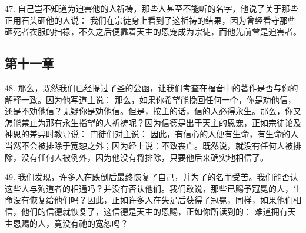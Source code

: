 47. 自己岂不知道为迫害他的人祈祷，那些人甚至不能听的名字，他说了关于那些正用石头砸他的人说： 我们在宗徒身上看到了这祈祷的结果，因为曾经看守那些砸死者衣服的扫禄，不久之后便靠着天主的恩宠成为宗徒，而他先前曾是迫害者。\par


\subsection{第十一章}

\par

48. 那么，既然我们已经提过了圣的公函，让我们考查在福音中的著作是否与你的解释一致。因为他写道主说： 那么，如果你希望能挽回任何一个，你是劝他信，还是不劝他信？无疑你是劝他信。但是，按主的话，信的人必得永生。那么，你又怎能禁止为那有永生指望的人祈祷呢？因为信德是出于天主的恩宠，正如宗徒论及神恩的差异时教导说： 门徒们对主说： 因此，有信心的人便有生命，有生命的人当然不会被排除于宽恕之外；因为经上说：不致丧亡。既然说，就没有任何人被排除，没有任何人被例外，因为他没有将排除，只要他后来确实地相信了。\par

49. 我们发现，许多人在跌倒后最终恢复了自己，并为了的名而受苦。我们能否认这些人与殉道者的相通吗？并没有否认他们。我们敢说，那些已赐予冠冕的人，生命没有恢复给他们吗？因此，正如许多人在失足后获得了冠冕，同样，如果他们相信，他们的信德就恢复了，这信德是天主的恩赐，正如你所读到的：  难道拥有天主恩赐的人，竟没有祂的宽恕吗？\par

